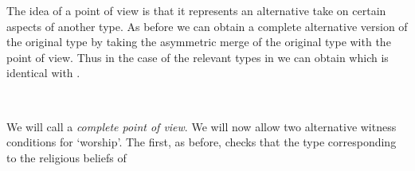 The idea of a point of view is that it represents an alternative take
on certain aspects of another type.  As before we can obtain a complete
alternative version of the original type by taking the asymmetric
merge of the original type with the point of view.  Thus in the case
of the relevant types in \preveg{} we can obtain  which is
identical with .
\begin{ex} 
\begin{subex} 
 
\item {}
                              \fbox{\d{$\wedge$}} \\
\hspace*{4em}
 
\item  {}
 
\end{subex} 
\label{ex:complete_pov_Zeus_Jupiter}   
\end{ex} 
We will call \preveg{} a \textit{complete point of view}.  We will now
allow two alternative witness conditions for `worship'.  The first, as
before, checks that the type corresponding to the religious beliefs of
